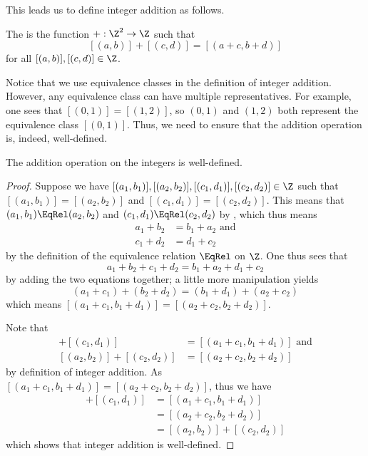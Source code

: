 This leads us to define integer addition as follows.
\begin{definition}
    The  is the function $+: \Z^2 \to \Z$ such that
    \[
        [(a, b)] + [(c, d)] = [(a + c, b + d)]
    \]
    for all $[(a, b)], [(c, d)] \in \Z$.
\end{definition}

Notice that we use equivalence classes in the definition of integer addition. However, any equivalence class can have multiple representatives. For example, one sees that $[(0, 1)] = [(1, 2)]$, so $(0, 1)$ and $(1, 2)$ both represent the equivalence class $[(0, 1)]$. Thus, we need to ensure that the addition operation is, indeed, well-defined.

\begin{proposition}
    The addition operation on the integers is well-defined.
\end{proposition}
\begin{proof}
    Suppose we have $[(a_1, b_1)], [(a_2, b_2)], [(c_1, d_1)], [(c_2, d_2)] \in \Z$ such that $[(a_1, b_1)] = [(a_2, b_2)]$ and $[(c_1, d_1)] = [(c_2, d_2)]$. This means that $(a_1, b_1) \EqRel (a_2, b_2)$ and $(c_1, d_1) \EqRel (c_2, d_2)$ by , which thus means
    \begin{align*}
        a_1 + b_2 &= b_1 + a_2 \text{ and}\\
        c_1 + d_2 &= d_1 + c_2
    \end{align*}
    by the definition of the equivalence relation $\EqRel$ on $\Z$. One thus sees that
    \[
        a_1 + b_2 + c_1 + d_2 = b_1 + a_2 + d_1 + c_2
    \]
    by adding the two equations together; a little more manipulation yields
    \[
        (a_1 + c_1) + (b_2 + d_2) = (b_1 + d_1) + (a_2 + c_2)
    \]
    which means $[(a_1 + c_1, b_1 + d_1)] = [(a_2 + c_2, b_2 + d_2)]$.

    Note that
    \begin{align*}
        [(a_1, b_1)] + [(c_1, d_1)] &= [(a_1 + c_1, b_1 + d_1)] \text{ and}\\
        [(a_2, b_2)] + [(c_2, d_2)] &= [(a_2 + c_2, b_2 + d_2)]
    \end{align*}
    by definition of integer addition. As $[(a_1 + c_1, b_1 + d_1)] = [(a_2 + c_2, b_2 + d_2)]$, thus we have
    \begin{align*}
        [(a_1, b_1)] + [(c_1, d_1)] &= [(a_1 + c_1, b_1 + d_1)]\\
        &= [(a_2 + c_2, b_2 + d_2)]\\
        &= [(a_2, b_2)] + [(c_2, d_2)]
    \end{align*}
    which shows that integer addition is well-defined.
\end{proof}

